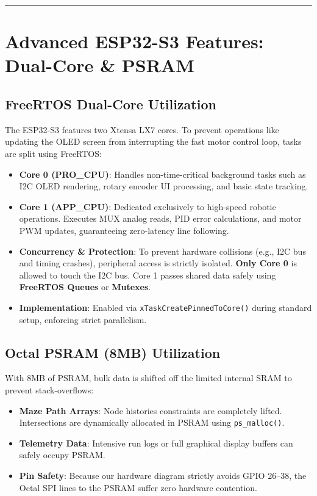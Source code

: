 \documentclass[12pt,a4paper]{article}
\begin{document}
\vspace{1em}
\hrule
\vspace{1em}

\section{Advanced ESP32-S3 Features: Dual-Core \& PSRAM}

\subsection*{FreeRTOS Dual-Core Utilization}
The ESP32-S3 features two Xtensa LX7 cores. To prevent operations like updating the OLED screen from interrupting the fast motor control loop, tasks are split using FreeRTOS:
\begin{itemize}
    \item \textbf{Core 0 (PRO\_CPU)}: Handles non-time-critical background tasks such as I2C OLED rendering, rotary encoder UI processing, and basic state tracking.
    \item \textbf{Core 1 (APP\_CPU)}: Dedicated exclusively to high-speed robotic operations. Executes MUX analog reads, PID error calculations, and motor PWM updates, guaranteeing zero-latency line following.
    \item \textbf{Concurrency \& Protection}: To prevent hardware collisions (e.g., I2C bus and timing crashes), peripheral access is strictly isolated. \textbf{Only Core 0} is allowed to touch the I2C bus. Core 1 passes shared data safely using \textbf{FreeRTOS Queues} or \textbf{Mutexes}.
    \item \textbf{Implementation}: Enabled via \lstinline|xTaskCreatePinnedToCore()| during standard setup, enforcing strict parallelism.
\end{itemize}

\subsection*{Octal PSRAM (8MB) Utilization}
With 8MB of PSRAM, bulk data is shifted off the limited internal SRAM to prevent stack-overflows:
\begin{itemize}
    \item \textbf{Maze Path Arrays}: Node histories constraints are completely lifted. Intersections are dynamically allocated in PSRAM using \lstinline|ps_malloc()|.
    \item \textbf{Telemetry Data}: Intensive run logs or full graphical display buffers can safely occupy PSRAM.
    \item \textbf{Pin Safety}: Because our hardware diagram strictly avoids GPIO 26--38, the Octal SPI lines to the PSRAM suffer zero hardware contention.
\end{itemize}
\end{document}
